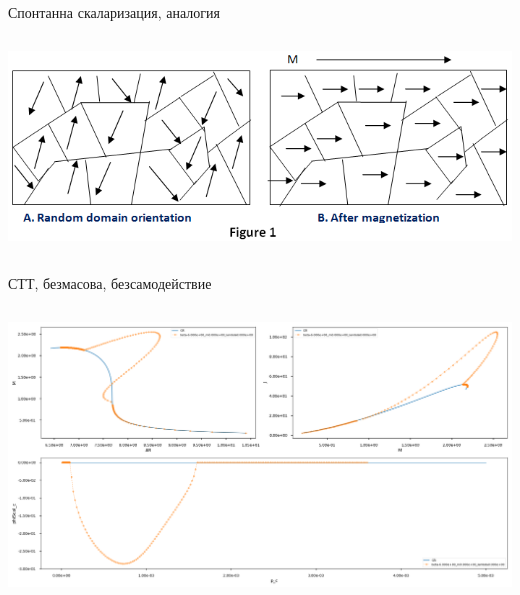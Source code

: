 \documentclass[10pt,a4paper]{beamer}
\begin{document}
        \begin{frame}{ Спонтанна скаларизация, аналогия }
            
            \begin{columns}
                \begin{column}{0.9\textwidth}
                    \includegraphics[width=\textwidth]{images/spont_magn.png}
                \end{column}
            \end{columns}
            
        \end{frame}
        
        \begin{frame}{ СТТ, безмасова, безсамодействие }
            \begin{columns}
                \begin{column}{\textwidth}
                    \includegraphics[width=\textwidth]{images/STT_beta-6_m0_lambda0.png}
                \end{column}
            \end{columns}
        \end{frame}
    
\end{document}

